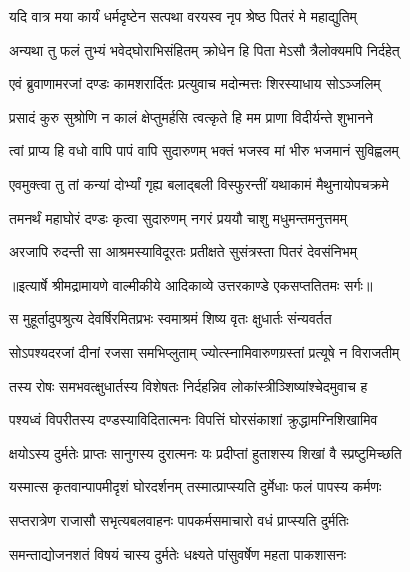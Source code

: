 \twolineshloka
{यदि वात्र मया कार्यं धर्मदृष्टेन सत्पथा}
{वरयस्व नृप श्रेष्ठ पितरं मे महाद्युतिम्} %

\twolineshloka
{अन्यथा तु फलं तुभ्यं भवेद्घोराभिसंहितम्}
{क्रोधेन हि पिता मेऽसौ त्रैलोक्यमपि निर्दहेत्} %

\twolineshloka
{एवं ब्रुवाणामरजां दण्डः कामशरार्दितः}
{प्रत्युवाच मदोन्मत्तः शिरस्याधाय सोऽञ्जलिम्} %

\twolineshloka
{प्रसादं कुरु सुश्रोणि न कालं क्षेप्तुमर्हसि}
{त्वत्कृते हि मम प्राणा विदीर्यन्ते शुभानने} %

\twolineshloka
{त्वां प्राप्य हि वधो वापि पापं वापि सुदारुणम्}
{भक्तं भजस्व मां भीरु भजमानं सुविह्वलम्} %

\twolineshloka
{एवमुक्त्वा तु तां कन्यां दोर्भ्यां गृह्य बलाद्बली}
{विस्फुरन्तीं यथाकामं मैथुनायोपचक्रमे} %

\twolineshloka
{तमनर्थं महाघोरं दण्डः कृत्वा सुदारुणम्}
{नगरं प्रययौ चाशु मधुमन्तमनुत्तमम्} %

\twolineshloka
{अरजापि रुदन्ती सा आश्रमस्याविदूरतः}
{प्रतीक्षते सुसंत्रस्ता पितरं देवसंनिभम्} %


{॥इत्यार्षे श्रीमद्रामायणे वाल्मीकीये आदिकाव्ये उत्तरकाण्डे एकसप्ततितमः सर्गः॥}


\twolineshloka
{स मुहूर्तादुपश्रुत्य देवर्षिरमितप्रभः}
{स्वमाश्रमं शिष्य वृतः क्षुधार्तः संन्यवर्तत} %

\twolineshloka
{सोऽपश्यदरजां दीनां रजसा समभिप्लुताम्}
{ज्योत्स्नामिवारुणग्रस्तां प्रत्यूषे न विराजतीम्} %

\twolineshloka
{तस्य रोषः समभवत्क्षुधार्तस्य विशेषतः}
{निर्दहन्निव लोकांस्त्रीञ्शिष्यांश्चेदमुवाच ह} %

\twolineshloka
{पश्यध्वं विपरीतस्य दण्डस्याविदितात्मनः}
{विपत्तिं घोरसंकाशां क्रुद्धामग्निशिखामिव} %

\twolineshloka
{क्षयोऽस्य दुर्मतेः प्राप्तः सानुगस्य दुरात्मनः}
{यः प्रदीप्तां हुताशस्य शिखां वै स्प्रष्टुमिच्छति} %

\twolineshloka
{यस्मात्स कृतवान्पापमीदृशं घोरदर्शनम्}
{तस्मात्प्राप्स्यति दुर्मेधाः फलं पापस्य कर्मणः} %

\twolineshloka
{सप्तरात्रेण राजासौ सभृत्यबलवाहनः}
{पापकर्मसमाचारो वधं प्राप्स्यति दुर्मतिः} %

\twolineshloka
{समन्ताद्योजनशतं विषयं चास्य दुर्मतेः}
{धक्ष्यते पांसुवर्षेण महता पाकशासनः} %

